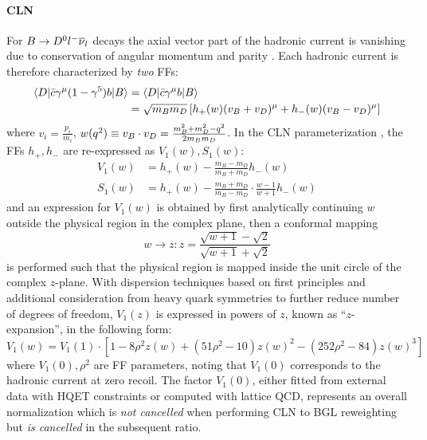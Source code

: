 \paragraph{CLN}
For $B \rightarrow {\ensuremath{{D}^0}}{\ensuremath{l^-}}{\ensuremath{{\overline{\nu}}_l}}$ decays the axial vector part of the hadronic
current is vanishing due to conservation of angular momentum and parity
\cite{Bernlochner_2022}.
Each hadronic current is therefore characterized by \emph{two} FFs:
\begin{align}
    \langle D\rvert \bar{c} \gamma^\mu(1 - \gamma^5) b \lvert B\rangle &=
    \langle D\rvert \bar{c} \gamma^\mu b \lvert B\rangle
    \nonumber \\
    &=
    \sqrt{m_B m_D} \left[
        h_+(w)(v_B + v_D)^\mu + h_-(w)(v_B - v_D)^\mu
    \right]
    \label{eqn:b-d-cln-param}
\end{align}
where $v_i = \frac{p_i}{m_i}$,
$w(q^2) \equiv v_B \cdot v_D = \frac{m^2_B + m^2_D - q^2}{2 m_B m_D}$.
In the CLN parameterization \cite{Caprini_1998},
the FFs $h_+, h_-$ are re-expressed as $V_1(w), S_1(w)$:
\begin{align}
    V_1(w) &= h_+(w) - \frac{m_B - m_D}{m_B + m_D} h_-(w) \\
    S_1(w) &= h_+(w) - \frac{m_B + m_D}{m_B - m_D} \cdot \frac{w-1}{w+1} h_-(w)
\end{align}
and an expression for $V_1(w)$ is obtained by first analytically continuing $w$
outside the physical region in the complex plane, then a conformal mapping
\begin{equation}
    w \rightarrow z: z =
    \frac{\sqrt{w+1} - \sqrt{2}}{\sqrt{w+1} + \sqrt{2}}
\end{equation}
is performed such that the physical region is mapped inside the unit circle of
the complex $z$-plane.
With dispersion techniques based on first principles and additional
consideration from heavy quark symmetries to further reduce number of degrees of
freedom,
$V_1(z)$ is expressed in powers of $z$, known as ``$z$-expansion'', in the
following form:
\begin{equation}
    V_1(w) = V_1(1) \cdot \left[
        1 - 8 \rho^2 z(w) + (51 \rho^2 - 10) z(w)^2 -
        (252 \rho^2 - 84) z(w)^3
    \right]
\end{equation}
where $V_1(0), \rho^2$ are FF parameters,
noting that $V_1(0)$ corresponds to the hadronic current at zero recoil.
The factor $V_1(0)$,
either fitted from external data with HQET constraints or computed with lattice
QCD,
represents an overall normalization which is \emph{not cancelled} when
performing CLN to BGL reweighting but \emph{is cancelled} in the subsequent
\RD ratio.

